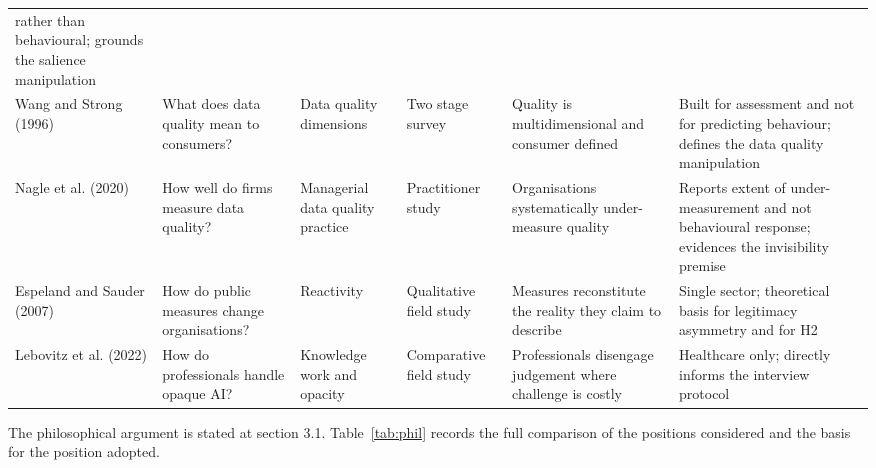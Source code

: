 \documentclass[12pt,a4paper]{article}
\begin{document}
\begin{longtable}{@{}p{2.4cm} p{2.5cm} p{2.0cm} p{2.1cm} p{2.5cm} p{2.6cm}@{}}
rather than behavioural; grounds the salience manipulation \\
\addlinespace
\footnotesize Wang and Strong (1996) & What does data quality mean to consumers? & Data quality dimensions &
Two stage survey & Quality is multidimensional and consumer defined & Built for assessment and not for
predicting behaviour; defines the data quality manipulation \\
\addlinespace
\footnotesize Nagle et al. (2020) & How well do firms measure data quality? & Managerial data quality
practice & Practitioner study & Organisations systematically under-measure quality & Reports extent of
under-measurement and not behavioural response; evidences the invisibility premise \\
\addlinespace
\footnotesize Espeland and Sauder (2007) & How do public measures change organisations? & Reactivity &
Qualitative field study & Measures reconstitute the reality they claim to describe & Single sector;
theoretical basis for legitimacy asymmetry and for H2 \\
\addlinespace
\footnotesize Lebovitz et al. (2022) & How do professionals handle opaque AI? & Knowledge work and
opacity & Comparative field study & Professionals disengage judgement where challenge is costly &
Healthcare only; directly informs the interview protocol \\
\end{longtable}

\newpage
{}

The philosophical argument is stated at section 3.1. Table~\ref{tab:phil} records the full comparison
of the positions considered and the basis for the position adopted.
\end{document}

